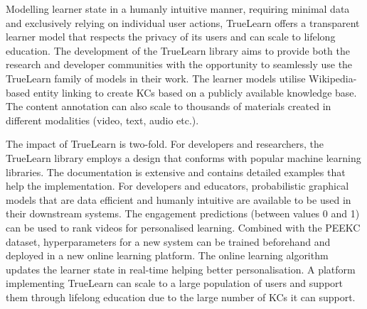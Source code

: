 \documentclass[letterpaper]{article} %
\begin{document}
{Modelling learner state in a humanly intuitive manner, requiring minimal data and exclusively relying on individual user actions, TrueLearn offers a transparent learner model that respects the privacy of its users and can scale to lifelong education. The development of the TrueLearn library aims to provide both the research and developer communities with the opportunity to seamlessly use the TrueLearn family of models in their work. The learner models utilise Wikipedia-based entity linking to create KCs based on a publicly available knowledge base. The content annotation can also scale to thousands of materials created in different modalities (video, text, audio etc.).}

{The impact of TrueLearn is two-fold. For developers and researchers, the TrueLearn library employs a design that conforms with popular machine learning libraries. The documentation is extensive and contains detailed examples that help the implementation. For developers and educators, probabilistic graphical models that are data efficient and humanly intuitive are available to be used in their downstream systems. The engagement predictions (between values 0 and 1) can be used to rank videos for personalised learning. Combined with the PEEKC dataset, hyperparameters for a new system can be trained beforehand and deployed in a new online learning platform. The online learning algorithm updates the learner state in real-time helping better personalisation. A platform implementing TrueLearn can scale to a large population of users and support them through lifelong education due to the large number of KCs it can support.}


\end{document}
